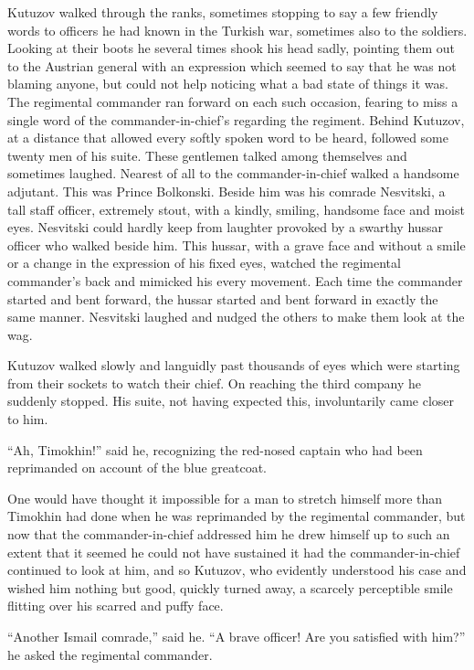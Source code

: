 Kutuzov walked through the ranks, sometimes stopping to say a few
friendly words to officers he had known in the Turkish war,
sometimes also to the soldiers. Looking at their boots he several
times shook his head sadly, pointing them out to the Austrian
general with an expression which seemed to say that he was not
blaming anyone, but could not help noticing what a bad state of
things it was. The regimental commander ran forward on each such
occasion, fearing to miss a single word of the
commander-in-chief's regarding the regiment. Behind Kutuzov, at a
distance that allowed every softly spoken word to be heard,
followed some twenty men of his suite. These gentlemen talked
among themselves and sometimes laughed. Nearest of all to the
commander-in-chief walked a handsome adjutant. This was Prince
Bolkonski. Beside him was his comrade Nesvitski, a tall staff
officer, extremely stout, with a kindly, smiling, handsome face
and moist eyes. Nesvitski could hardly keep from laughter
provoked by a swarthy hussar officer who walked beside him.  This
hussar, with a grave face and without a smile or a change in the
expression of his fixed eyes, watched the regimental commander's
back and mimicked his every movement. Each time the commander
started and bent forward, the hussar started and bent forward in
exactly the same manner. Nesvitski laughed and nudged the others
to make them look at the wag.

Kutuzov walked slowly and languidly past thousands of eyes which
were starting from their sockets to watch their chief. On
reaching the third company he suddenly stopped. His suite, not
having expected this, involuntarily came closer to him.

``Ah, Timokhin!'' said he, recognizing the red-nosed captain who
had been reprimanded on account of the blue greatcoat.

One would have thought it impossible for a man to stretch himself
more than Timokhin had done when he was reprimanded by the
regimental commander, but now that the commander-in-chief
addressed him he drew himself up to such an extent that it seemed
he could not have sustained it had the commander-in-chief
continued to look at him, and so Kutuzov, who evidently
understood his case and wished him nothing but good, quickly
turned away, a scarcely perceptible smile flitting over his
scarred and puffy face.

``Another Ismail comrade,'' said he. ``A brave officer! Are you
satisfied with him?'' he asked the regimental commander.

